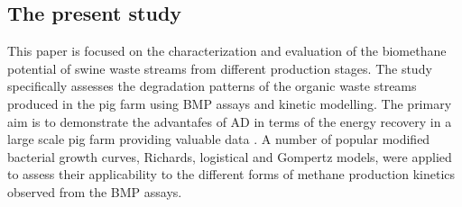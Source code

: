 \subsection{The present study}
This paper is focused on the characterization and evaluation of the biomethane potential of swine waste streams from different production stages. The study specifically assesses the degradation patterns of the organic waste streams produced in the pig farm using BMP assays and kinetic modelling. The primary aim is to demonstrate the advantafes of AD in terms of the energy recovery in a large scale pig farm providing valuable data . A number of popular modified bacterial growth curves, Richards, logistical and Gompertz models, were applied to assess their applicability to the different forms of methane production kinetics observed from the BMP assays.